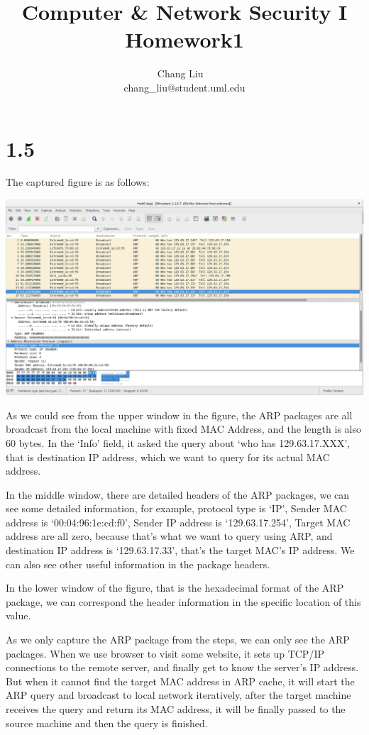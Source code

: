 \documentclass{article}
\title{Computer \& Network Security I Homework1}
\author{Chang Liu ~\\ chang\_liu@student.uml.edu}
\begin{document}
\maketitle

\section{1.5}

The captured figure is as follows:

\begin{center}
\includegraphics[scale=0.25]{hw1_fig1.png}
\end{center}

As we could see from the upper window in the figure, the ARP packages are all broadcast from the local machine with fixed MAC Address, and the length is also 60 bytes. In the `Info' field, it asked the query about `who has 129.63.17.XXX', that is destination IP address, which we
want to query for its actual MAC address.

In the middle window, there are detailed headers of the ARP packages, we can see some detailed information, for example, protocol type is `IP',
Sender MAC address is `00:04:96:1e:cd:f0', Sender IP address is `129.63.17.254', Target MAC address are all zero, because that's what we want to
query using ARP, and destination IP address is `129.63.17.33', that's the target MAC's IP address. We can also see other useful information in
the package headers.

In the lower window of the figure, that is the hexadecimal format of the ARP package, we can correspond the header information in the specific
location of this value.

As we only capture the ARP package from the steps, we can only see the ARP packages. When we use browser to visit some website, it sets up TCP/IP connections to the remote server, and finally get to know the server's IP address. But when it cannot find the target MAC address in ARP cache,
it will start the ARP query and broadcast to local network iteratively, after the target machine receives the query and return its MAC address,
it will be finally passed to the source machine and then the query is finished.
\end{document}
